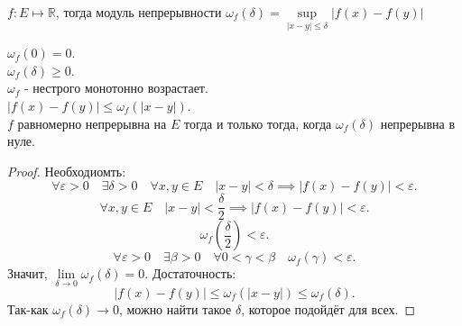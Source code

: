 \documentclass[11pt, oneside]{article}   	%
\begin{document}
    \begin{definition}
        $f: E \mapsto \mathbb{R}$, тогда модуль непрерывности $\omega_{f}(\delta) = \sup\limits_{|x-y| \le \delta} |f(x)-f(y)|$
    \end{definition}
    \begin{dlemma}
        $\omega_{f}(0) = 0$.\\
        $\omega_{f}(\delta) \ge  0$.\\
        $\omega_{f}$ - нестрого монотонно возрастает.\\
        $|f(x)-f(y)| \le \omega_{f}(|x-y|)$.\\
        $f$ равномерно непрерывна на $E$ тогда и только тогда, когда $\omega_f(\delta)$ непрерывна в нуле.
        \begin{proof}
            Необходиомть:
            \[ \forall{\varepsilon > 0}\quad \exists{\delta > 0}\quad \forall{x, y\in E}\quad |x-y| < \delta \implies |f(x) - f(y)| < \varepsilon .\]
            \[ \forall{x, y\in E}\quad |x-y| < \frac{\delta}{2} \implies |f(x)-f(y)|<\varepsilon .\]
            \[ \omega_{f}\left(\frac{\delta}{2}\right) < \varepsilon  .\]
            \[ \forall{\varepsilon > 0}\quad \exists{\beta > 0}\quad \forall{0 < \gamma < \beta}\quad \omega_{f}(\gamma) < \varepsilon .\]
            Значит, $\lim\limits_{\delta \to 0} \omega_f(\delta) = 0$.
            Достаточность:
            \[ |f(x)-f(y)| \le \omega_{f}(|x-y|) \le \omega_{f}(\delta).\]
            Так-как $\omega_{f}(\delta) \to 0$, можно найти такое $\delta$, которое подойдёт для всех. 
        \end{proof}
    \end{dlemma}
\end{document}
